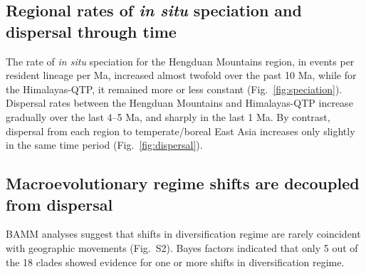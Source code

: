 \subsection{Regional rates of \textit{in situ} speciation and dispersal through time}

The rate of \textit{in situ} speciation for the Hengduan Mountains region, in events per resident lineage per Ma, increased almost twofold over the past 10 Ma, while for the Himalayas-QTP, it remained more or less constant (Fig.~\ref{fig:speciation}). Dispersal rates between the Hengduan Mountains and Himalayas-QTP increase gradually over the last 4--5 Ma, and sharply in the last 1 Ma. By contrast, dispersal from each region to temperate/boreal East Asia increases only slightly in the same time period (Fig.~\ref{fig:dispersal}).

\subsection{Macroevolutionary regime shifts are decoupled from dispersal}

BAMM analyses suggest that shifts in diversification regime are rarely coincident with geographic movements (Fig.~S2). Bayes factors indicated that only 5 out of the 18 clades showed evidence for one or more shifts in diversification regime. 

